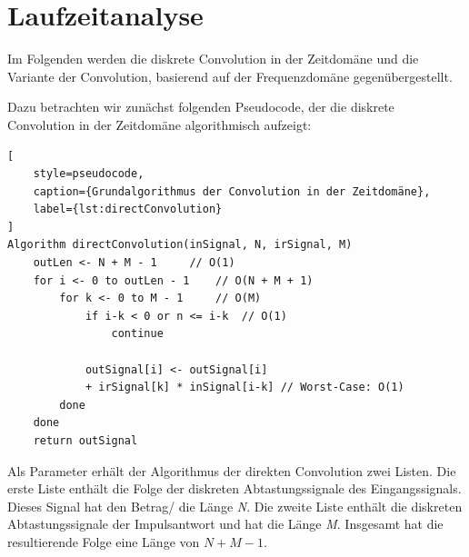 \section{Laufzeitanalyse}
\label{sec:runtime_analysis}

Im Folgenden werden die diskrete Convolution in der Zeitdomäne und die Variante der Convolution,
basierend auf der Frequenzdomäne gegenübergestellt.

Dazu betrachten wir zunächst folgenden Pseudocode, der die diskrete Convolution in der
Zeitdomäne algorithmisch aufzeigt:




\begin{lstlisting}[
    style=pseudocode,
    caption={Grundalgorithmus der Convolution in der Zeitdomäne},
    label={lst:directConvolution}
]
Algorithm directConvolution(inSignal, N, irSignal, M)
    outLen <- N + M - 1     // O(1)
    for i <- 0 to outLen - 1    // O(N + M + 1)
        for k <- 0 to M - 1     // O(M)
            if i-k < 0 or n <= i-k  // O(1)
                continue
            
            outSignal[i] <- outSignal[i]
            + irSignal[k] * inSignal[i-k] // Worst-Case: O(1)
        done
    done
    return outSignal
\end{lstlisting}

Als Parameter erhält der Algorithmus der direkten Convolution zwei Listen.
Die erste Liste enthält die Folge der diskreten Abtastungssignale des Eingangssignals.
Dieses Signal hat den Betrag/ die Länge \textit{N}.
Die zweite Liste enthält die diskreten Abtastungssignale der Impulsantwort und hat die Länge \textit{M}.
Insgesamt hat die resultierende Folge eine Länge von $N + M - 1$.

